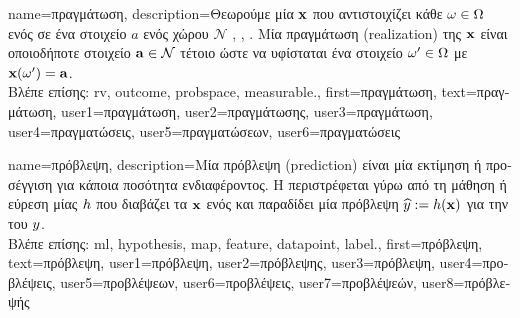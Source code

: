 {name={\foreignlanguage{greek}{πραγμάτωση}},
	description={\foreignlanguage{greek}{Θεωρούμε μία}  ${\bf x}$ 
		\foreignlanguage{greek}{που αντιστοιχίζει κάθε}  $\omega \in \Omega$ \foreignlanguage{greek}{ενός} 
		 \foreignlanguage{greek}{σε ένα στοιχείο $a$ ενός}  \foreignlanguage{greek}{χώρου} 
		$\mathcal{N}$ \cite{RudinBookPrinciplesMatheAnalysis}, \cite{BillingsleyProbMeasure}, \cite{HalmosMeasure}. 
		\foreignlanguage{greek}{Μία πραγμάτωση} (realization) \foreignlanguage{greek}{της ${\bf x}$ είναι οποιοδήποτε στοιχείο 
		${\bf a} \in \mathcal{N}$ τέτοιο ώστε να υφίσταται ένα στοιχείο $\omega' \in \Omega$ με} ${\bf x}(\omega') = {\bf a}$.
		\\
		\foreignlanguage{greek}{Βλέπε επίσης:} \gls{rv}, \gls{outcome}, \gls{probspace}, \gls{measurable}.}, 
	first={\foreignlanguage{greek}{πραγμάτωση}},
	text={\foreignlanguage{greek}{πραγμάτωση}},
	user1={\foreignlanguage{greek}{πραγμάτωση}}, %
  	user2={\foreignlanguage{greek}{πραγμάτωσης}}, %
	user3={\foreignlanguage{greek}{πραγμάτωση}}, %
  	user4={\foreignlanguage{greek}{πραγματώσεις}}, %
	user5={\foreignlanguage{greek}{πραγματώσεων}}, %
  	user6={\foreignlanguage{greek}{πραγματώσεις}} %
}

{name={\foreignlanguage{greek}{πρόβλεψη}},
	description={\foreignlanguage{greek}{Μία πρόβλεψη} (prediction)
		\foreignlanguage{greek}{είναι μία εκτίμηση ή προσέγγιση για κάποια ποσότητα ενδιαφέροντος. Η} 
		 \foreignlanguage{greek}{περιστρέφεται γύρω από τη μάθηση ή εύρεση μίας}  
		 $h$ \foreignlanguage{greek}{που διαβάζει τα}  ${\bf x}$ 
		\foreignlanguage{greek}{ενός}  \foreignlanguage{greek}{και παραδίδει μία πρόβλεψη 
		$\widehat{y} := h({\bf x})$ για την}  \foreignlanguage{greek}{του} $y$.
		\\
		\foreignlanguage{greek}{Βλέπε επίσης:} \gls{ml}, \gls{hypothesis}, \gls{map}, \gls{feature}, \gls{datapoint}, \gls{label}.},
	first={\foreignlanguage{greek}{πρόβλεψη}},
	text={\foreignlanguage{greek}{πρό\-βλε\-ψη}},
	user1={\foreignlanguage{greek}{πρόβλεψη}}, %
  	user2={\foreignlanguage{greek}{πρόβλεψης}}, %
	user3={\foreignlanguage{greek}{πρόβλεψη}}, %
	user4={\foreignlanguage{greek}{προβλέψεις}}, %
	user5={\foreignlanguage{greek}{προβλέψεων}}, %
	user6={\foreignlanguage{greek}{προβλέψεις}}, %
	user7={\foreignlanguage{greek}{προβλέψεών}}, %
	user8={\foreignlanguage{greek}{πρόβλεψής}} %
}

